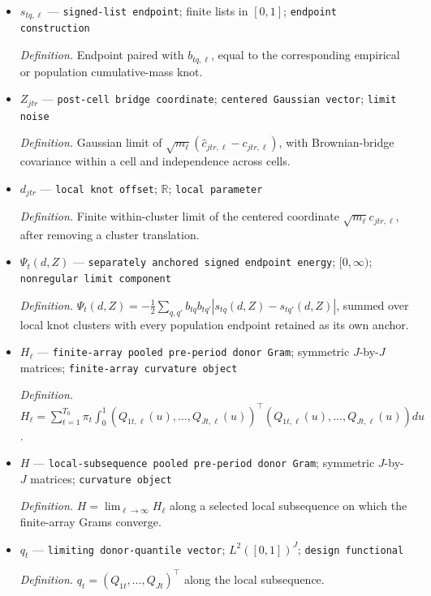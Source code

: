 \documentclass{article}
\begin{document}
\begin{itemize}
  \item \(s_{tq,\ell}\) --- \texttt{signed-\allowbreak{}list endpoint}; finite lists in \([0,1]\); \texttt{endpoint construction}
  \par\smallskip\noindent\emph{Definition.} Endpoint paired with \(b_{tq,\ell}\), equal to the corresponding empirical or population cumulative-mass knot.
  \item \(Z_{jtr}\) --- \texttt{post-\allowbreak{}cell bridge coordinate}; \texttt{centered Gaussian vector}; \texttt{limit noise}
  \par\smallskip\noindent\emph{Definition.} Gaussian limit of \(\sqrt{m_\ell}(\widehat c_{jtr,\ell}-c_{jtr,\ell})\), with Brownian-bridge covariance within a cell and independence across cells.
  \item \(d_{jtr}\) --- \texttt{local knot offset}; \(\mathbb R\); \texttt{local parameter}
  \par\smallskip\noindent\emph{Definition.} Finite within-cluster limit of the centered coordinate \(\sqrt{m_\ell}c_{jtr,\ell}\), after removing a cluster translation.
  \item \(\Psi_t(d,Z)\) --- \texttt{separately anchored signed endpoint energy}; \([0,\infty)\); \texttt{nonregular limit component}
  \par\smallskip\noindent\emph{Definition.} \(\Psi_t(d,Z)=-\tfrac12\sum_{q,q'}b_{tq}b_{tq'}|s_{tq}(d,Z)-s_{tq'}(d,Z)|\), summed over local knot clusters with every population endpoint retained as its own anchor.
  \item \(H_\ell\) --- \texttt{finite-\allowbreak{}array pooled pre-\allowbreak{}period donor Gram}; symmetric \(J\)-by-\(J\) matrices; \texttt{finite-\allowbreak{}array curvature object}
  \par\smallskip\noindent\emph{Definition.} \(H_\ell=\sum_{t=1}^{T_0}\pi_t\int_0^1(Q_{1t,\ell}(u),\ldots,Q_{Jt,\ell}(u))^\top(Q_{1t,\ell}(u),\ldots,Q_{Jt,\ell}(u))du\).
  \item \(H\) --- \texttt{local-\allowbreak{}subsequence pooled pre-\allowbreak{}period donor Gram}; symmetric \(J\)-by-\(J\) matrices; \texttt{curvature object}
  \par\smallskip\noindent\emph{Definition.} \(H=\lim_{\ell\to\infty}H_\ell\) along a selected local subsequence on which the finite-array Grams converge.
  \item \(q_t\) --- \texttt{limiting donor-\allowbreak{}quantile vector}; \(L^2([0,1])^J\); \texttt{design functional}
  \par\smallskip\noindent\emph{Definition.} \(q_t=(Q_{1t},\ldots,Q_{Jt})^\top\) along the local subsequence.

\end{itemize}
\end{document}
